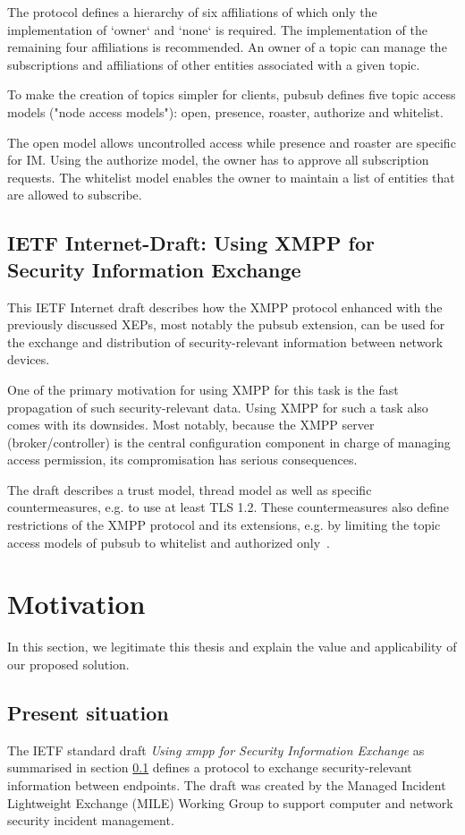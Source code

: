 The protocol defines a hierarchy of six affiliations of which only the implementation of `owner` and `none` is required. The implementation of the remaining four affiliations is recommended. An owner of a topic can manage the subscriptions and affiliations of other entities associated with a given topic.

To make the creation of topics simpler for clients, \gls{pubsub} defines five topic access models ("node access models"): open, presence, roaster, authorize and whitelist.

The open model allows uncontrolled access while presence and roaster are specific for IM. Using the authorize model, the owner has to approve all subscription requests. The whitelist model enables the owner to maintain a list of entities that are allowed to subscribe.

\subsection{IETF Internet-Draft: Using XMPP for Security Information Exchange}\label{sec:ietf-internet-draft-using-xmpp-for-security-information-exchange}
This IETF Internet draft describes how the XMPP protocol enhanced with the previously discussed XEPs, most notably the \gls{pubsub} extension, can be used for the exchange and distribution of security-relevant information between network devices.

One of the primary motivation for using XMPP for this task is the fast propagation of such security-relevant data.
Using XMPP for such a task also comes with its downsides. Most notably, because the XMPP server (\gls{broker}/\gls{controller}) is the central configuration component in charge of managing access permission, its compromisation has serious consequences.

The draft describes a trust model, thread model as well as specific countermeasures, e.g. to use at least TLS 1.2. These countermeasures also define restrictions of the XMPP protocol and its extensions, e.g. by limiting the topic access models of \gls{pubsub} to whitelist and authorized only~\cite{ietf-mile-xmpp-grid-05}.

\section{Motivation}
In this section, we legitimate this thesis and explain the value and applicability of our proposed solution.

\subsection{Present situation}
The IETF standard draft \emph{Using \gls{xmpp} for Security Information Exchange} \cite{ietf-mile-xmpp-grid-05} as summarised in section \ref{sec:ietf-internet-draft-using-xmpp-for-security-information-exchange} defines a protocol to exchange security-relevant information between endpoints.
The draft was created by the Managed Incident Lightweight Exchange (MILE) Working Group to support computer and network security incident management.

